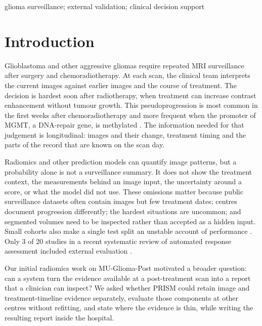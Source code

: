 \documentclass[largeformat]{interact} %
\begin{document}
\begin{keywords}
glioma surveillance; external validation; clinical decision support
\end{keywords}

\section{Introduction}\label{sec:1}

Glioblastoma and other aggressive gliomas require repeated MRI surveillance after surgery and chemoradiotherapy. At
each scan, the clinical team interprets the current images against earlier images and the course of treatment. The
decision is hardest soon after radiotherapy, when treatment can increase contrast enhancement without tumour growth.
This pseudoprogression is most common in the first weeks after chemoradiotherapy and more frequent when the promoter
of MGMT, a DNA-repair gene, is methylated \citep{taal2008,brandes2008}. The information needed for that judgement is
longitudinal: images and their change, treatment timing and the parts of the record that are known on the scan day.

Radiomics and other prediction models can quantify image patterns, but a probability alone is not a surveillance
summary. It does not show the treatment context, the measurements behind an image input, the uncertainty around a
score, or what the model did not use. These omissions matter because public surveillance datasets often contain images
but few treatment dates; centres document progression differently; the hardest situations are uncommon; and segmented
volumes need to be inspected rather than accepted as a hidden input. Small cohorts also make a single test split an
unstable account of performance \citep{an2021,varoquaux2018}. Only 3 of 20 studies in a recent systematic review of
automated response assessment included external evaluation \citep{shi2025}.

Our initial radiomics work on MU-Glioma-Post motivated a broader question: can a system turn the evidence available at
a post-treatment scan into a report that a clinician can inspect? We asked whether PRISM could retain image and
treatment-timeline evidence separately, evaluate those components at other centres without refitting, and state where
the evidence is thin, while writing the resulting report inside the hospital.
\end{document}
